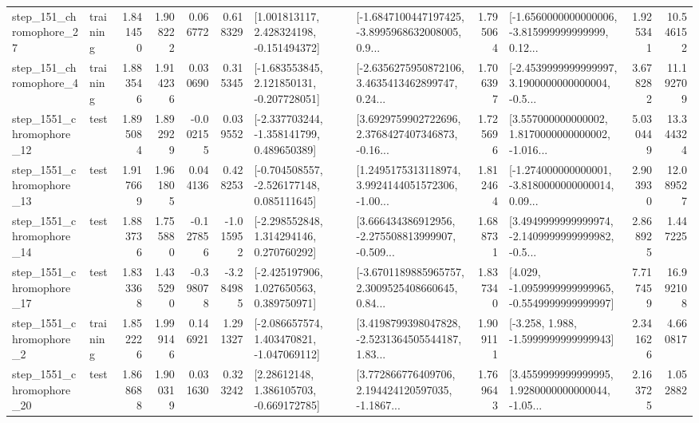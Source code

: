 \begin{tabular}{llrrrrllrlrr}
  step\_151\_chromophore\_27 &  training &      1.841450 &    1.908222 &      0.066772 &  0.618329 &    [1.001813117, 2.428324198, -0.151494372] &  [-1.6847100447197425, -3.8995968632008005, 0.9... &       1.795064 &  [-1.6560000000000006, -3.815999999999999, 0.12... &            1.925341 &         10.546152 \\
   step\_151\_chromophore\_4 &  training &      1.883546 &    1.914236 &      0.030690 &  0.315345 &   [-1.683553845, 2.121850131, -0.207728051] &  [-2.6356275950872106, 3.4635413462899747, 0.24... &       1.706397 &  [-2.4539999999999997, 3.1900000000000004, -0.5... &            3.678282 &         11.192709 \\
 step\_1551\_chromophore\_12 &      test &      1.895084 &    1.892929 &     -0.002155 &  0.039552 &   [-2.337703244, -1.358141799, 0.489650389] &  [3.6929759902722696, 2.3768427407346873, -0.16... &       1.725696 &  [3.557000000000002, 1.8170000000000002, -1.016... &            5.030449 &         13.344324 \\
 step\_1551\_chromophore\_13 &      test &      1.917669 &    1.961805 &      0.044136 &  0.428253 &   [-0.704508557, -2.526177148, 0.085111645] &  [1.2495175313118974, 3.9924144051572306, -1.00... &       1.812464 &  [-1.274000000000001, -3.8180000000000014, 0.09... &            2.903930 &         12.089527 \\
 step\_1551\_chromophore\_14 &      test &      1.883736 &    1.755880 &     -0.127856 & -1.015952 &    [-2.298552848, 1.314294146, 0.270760292] &  [3.666434386912956, -2.275508813999907, -0.509... &       1.688731 &  [3.4949999999999974, -2.1409999999999982, -0.5... &            2.868925 &          1.447225 \\
 step\_1551\_chromophore\_17 &      test &      1.833368 &    1.435290 &     -0.398078 & -3.284985 &    [-2.425197906, 1.027650563, 0.389750971] &  [-3.6701189885965757, 2.3009525408660645, 0.84... &       1.837340 &  [4.029, -1.0959999999999965, -0.5549999999999997] &            7.717459 &         16.992108 \\
  step\_1551\_chromophore\_2 &  training &      1.852226 &    1.999146 &      0.146921 &  1.291327 &   [-2.086657574, 1.403470821, -1.047069112] &  [3.4198799398047828, -2.5231364505544187, 1.83... &       1.909111 &               [-3.258, 1.988, -1.5999999999999943] &            2.341626 &          4.660817 \\
 step\_1551\_chromophore\_20 &      test &      1.868688 &    1.900319 &      0.031630 &  0.323242 &     [2.28612148, 1.386105703, -0.669172785] &  [3.772866776409706, 2.194424120597035, -1.1867... &       1.769643 &  [3.4559999999999995, 1.9280000000000044, -1.05... &            2.163725 &          1.052882 \\

\end{tabular}
